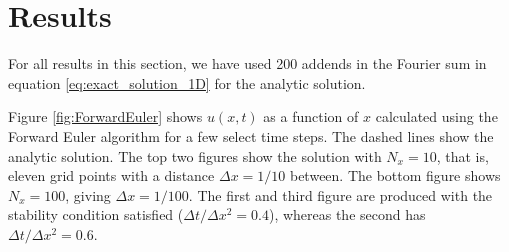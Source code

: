 \documentclass[reprint, english,notitlepage,nofootinbib]{revtex4-1}  %
\begin{document}
\section{Results}

For all results in this section, we have used 200 addends in the Fourier sum in equation \eqref{eq:exact_solution_1D} for the analytic solution.

Figure \ref{fig:ForwardEuler} shows \(u(x, t)\) as a function of \(x\) calculated using the Forward Euler algorithm for a few select time steps. The dashed lines show the analytic solution. The top two figures show the solution with $N_x = 10$, that is, eleven grid points with a distance \(\Delta x = 1/10\) between. The bottom figure shows \(N_x = 100\), giving \(\Delta x = 1/100\). The first and third figure are produced with the stability condition satisfied (\(\Delta t / \Delta x^2 = 0.4\)), whereas the second has \(\Delta t / \Delta x^2 = 0.6\).
\end{document}
